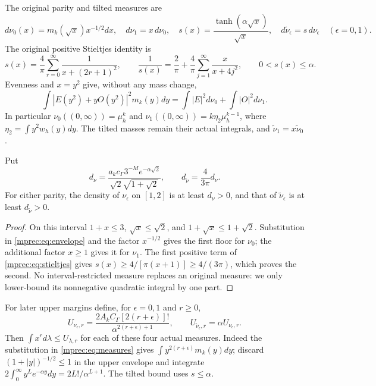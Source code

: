 \documentclass[11pt]{article}
\begin{document}
The original parity and tilted measures are
\begin{equation}\label{mprec:eq:measures}
 d\nu_0(x)=m_k(\sqrt x)x^{-1/2}dx,\quad d\nu_1=x\,d\nu_0,
 \quad s(x)=\frac{\tanh(\alpha\sqrt x)}{\sqrt x},\quad
 d\widetilde\nu_\epsilon=s\,d\nu_\epsilon\quad(\epsilon=0,1).
\end{equation}
The original positive Stieltjes identity \cite{mprec:PP,mprec:FM} is
\begin{equation}\label{mprec:eq:stieltjes}
 s(x)=\frac4\pi\sum_{r=0}^\infty\frac1{x+(2r+1)^2},\qquad
 \frac1{s(x)}=\frac2\pi+\frac4\pi\sum_{j=1}^\infty\frac{x}{x+4j^2},
 \qquad 0<s(x)\le\alpha.
\end{equation}
Evenness and $x=y^2$ give, without any mass change,
\[
 \int|E(y^2)+yO(y^2)|^2m_k(y)dy
 =\int|E|^2d\nu_0+\int|O|^2d\nu_1.
\]
In particular $\nu_0((0,\infty))=\mu_h^k$ and
$\nu_1((0,\infty))=k\eta_2\mu_h^{k-1}$, where
$\eta_2=\int y^2w_h(y)dy$. The tilted masses remain their actual
integrals, and $\widetilde\nu_1=x\widetilde\nu_0$.

\begin{mpreclemma}\label{mprec:lem:floor}
Put
\begin{equation}\label{mprec:eq:densityfloor}
 d_\nu=\frac{a_kc_\Gamma3^{-M}e^{-\alpha\sqrt2}}
 {\sqrt2\sqrt{1+\sqrt2}},\qquad
 d_{\widetilde\nu}=\frac4{3\pi}d_\nu.
\end{equation}
For either parity, the density of $\nu_\epsilon$ on $[1,2]$ is at
least $d_\nu>0$, and that of $\widetilde\nu_\epsilon$ is at least
$d_{\widetilde\nu}>0$.
\end{mpreclemma}
\begin{proof}
On this interval $1+x\le3$, $\sqrt x\le\sqrt2$, and
$1+\sqrt x\le1+\sqrt2$. Substitution in \eqref{mprec:eq:envelope}
and the factor $x^{-1/2}$ gives the first floor for $\nu_0$;
the additional factor $x\ge1$ gives it for $\nu_1$.
The first positive term of \eqref{mprec:eq:stieltjes} gives
$s(x)\ge4/[\pi(x+1)]\ge4/(3\pi)$, which proves the second.
No interval-restricted measure replaces an original measure: we
only lower-bound its nonnegative quadratic integral by one part.
\end{proof}

For later upper margins define, for $\epsilon=0,1$ and $r\ge0$,
\begin{equation}\label{mprec:eq:momentcaps}
 U_{\nu_\epsilon,r}=
 \frac{2A_kC_\Gamma[2(r+\epsilon)]!}
 {\alpha^{2(r+\epsilon)+1}},\qquad
 U_{\widetilde\nu_\epsilon,r}=\alpha U_{\nu_\epsilon,r}.
\end{equation}
Then $\int x^r d\lambda\le U_{\lambda,r}$ for each of these
four actual measures. Indeed the substitution in
\eqref{mprec:eq:measures} gives $\int y^{2(r+\epsilon)}m_k(y)dy$;
discard $(1+|y|)^{-1/2}\le1$ in the upper envelope and integrate
$2\int_0^\infty y^Le^{-\alpha y}dy=2L!/\alpha^{L+1}$.
The tilted bound uses $s\le\alpha$.
\end{document}
